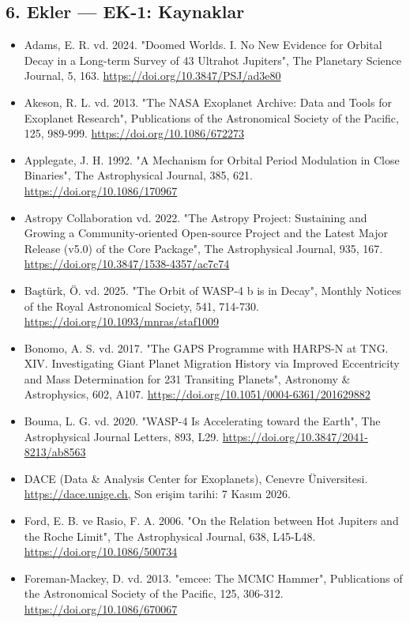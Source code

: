 \subsection*{6. Ekler — EK-1: Kaynaklar}
\begin{itemize}[leftmargin=1em,itemsep=1pt]
\item Adams, E. R. vd. 2024. "Doomed Worlds. I. No New Evidence for Orbital Decay in a Long-term Survey of 43 Ultrahot Jupiters", The Planetary Science Journal, 5, 163. \url{https://doi.org/10.3847/PSJ/ad3e80}
\item Akeson, R. L. vd. 2013. "The NASA Exoplanet Archive: Data and Tools for Exoplanet Research", Publications of the Astronomical Society of the Pacific, 125, 989-999. \url{https://doi.org/10.1086/672273}
\item Applegate, J. H. 1992. "A Mechanism for Orbital Period Modulation in Close Binaries", The Astrophysical Journal, 385, 621. \url{https://doi.org/10.1086/170967}
\item Astropy Collaboration vd. 2022. "The Astropy Project: Sustaining and Growing a Community-oriented Open-source Project and the Latest Major Release (v5.0) of the Core Package", The Astrophysical Journal, 935, 167. \url{https://doi.org/10.3847/1538-4357/ac7c74}
\item Baştürk, Ö. vd. 2025. "The Orbit of WASP-4 b is in Decay", Monthly Notices of the Royal Astronomical Society, 541, 714-730. \url{https://doi.org/10.1093/mnras/staf1009}
\item Bonomo, A. S. vd. 2017. "The GAPS Programme with HARPS-N at TNG. XIV. Investigating Giant Planet Migration History via Improved Eccentricity and Mass Determination for 231 Transiting Planets", Astronomy \& Astrophysics, 602, A107. \url{https://doi.org/10.1051/0004-6361/201629882}
\item Bouma, L. G. vd. 2020. "WASP-4 Is Accelerating toward the Earth", The Astrophysical Journal Letters, 893, L29. \url{https://doi.org/10.3847/2041-8213/ab8563}
\item DACE (Data \& Analysis Center for Exoplanets), Cenevre Üniversitesi. \url{https://dace.unige.ch,} Son erişim tarihi: 7 Kasım 2026.
\item Ford, E. B. ve Rasio, F. A. 2006. "On the Relation between Hot Jupiters and the Roche Limit", The Astrophysical Journal, 638, L45-L48. \url{https://doi.org/10.1086/500734}
\item Foreman-Mackey, D. vd. 2013. "emcee: The MCMC Hammer", Publications of the Astronomical Society of the Pacific, 125, 306-312. \url{https://doi.org/10.1086/670067}

\end{itemize}
